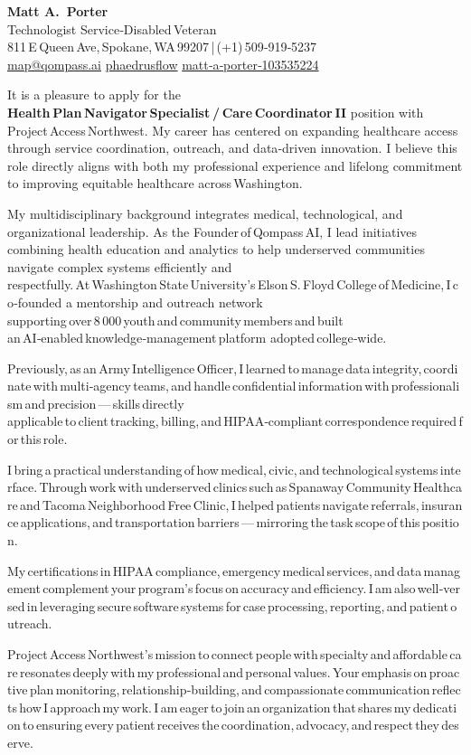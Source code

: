 \documentclass[11pt, a4paper]{awesome-cv}
\makeatletter
\providecommand{\namefont}{\fontfamily{phv}\selectfont\fontsize{24pt}{28pt}\bfseries}
\renewcommand*{\makecvheader}[1][]{%
  \begin{center}
    {\namefont Matt A.~Porter\\[3pt]}
    {\small Technologist\,{\Large\textperiodcentered}\,Service‑Disabled Veteran}\\[3pt]
    811 E Queen Ave, Spokane, WA 99207 \quad|\quad (+1) 509‑919‑5237\\[3pt]
    \href{mailto:map@qompass.ai}{\faEnvelope\enskip map@qompass.ai}\enskip
    \href{https://github.com/phaedrusflow}{\faGithub\enskip phaedrusflow}\enskip
    \href{https://www.linkedin.com/in/matt-a-porter-103535224}{\faLinkedin\enskip matt‑a‑porter‑103535224}
  \end{center}
  \vspace{1em}
  \par
}
\makeatother
\begin{document}
\linespread{1.2}
\setlength{\parskip}{0.75em}

\makecvheader[C]

\makelettertitle
\begin{cvletter}
\RaggedRight

It is a pleasure to apply for the \textbf{Health Plan Navigator Specialist / Care Coordinator II} position with Project Access Northwest. My career has centered on expanding healthcare access through service coordination, outreach, and data‑driven innovation. I believe this role directly aligns with both my professional experience and lifelong commitment to improving equitable healthcare across Washington.

My multidisciplinary background integrates medical, technological, and organizational leadership. As the Founder of Qompass AI, I lead initiatives combining health education and analytics to help underserved communities navigate complex systems efficiently and respectfully. At Washington State University’s Elson S. Floyd College of Medicine, I co‑founded a mentorship and outreach network supporting over 8 000 youth and community members and built an AI‑enabled knowledge‑management platform adopted college‑wide.

Previously, as an Army Intelligence Officer, I learned to manage data integrity, coordinate with multi‑agency teams, and handle confidential information with professionalism and precision — skills directly applicable to client tracking, billing, and HIPAA‑compliant correspondence required for this role.

I bring a practical understanding of how medical, civic, and technological systems interface. Through work with underserved clinics such as Spanaway Community Healthcare and Tacoma Neighborhood Free Clinic, I helped patients navigate referrals, insurance applications, and transportation barriers — mirroring the task scope of this position.

My certifications in HIPAA compliance, emergency medical services, and data management complement your program’s focus on accuracy and efficiency. I am also well‑versed in leveraging secure software systems for case processing, reporting, and patient outreach.

Project Access Northwest’s mission to connect people with specialty and affordable care resonates deeply with my professional and personal values. Your emphasis on proactive plan monitoring, relationship‑building, and compassionate communication reflects how I approach my work. I am eager to join an organization that shares my dedication to ensuring every patient receives the coordination, advocacy, and respect they deserve.

\end{cvletter}
\makeletterclosing
\end{document}
